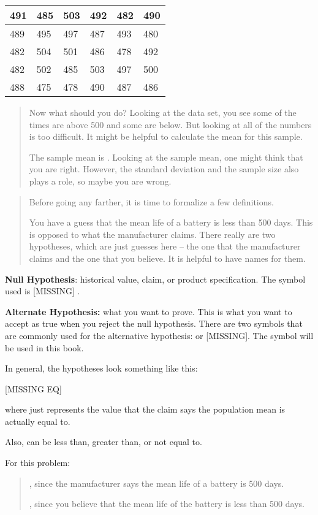\documentclass[]{book}
\begin{document}
\begin{longtable}[]{@{}llllll@{}}
\toprule
491 & 485 & 503 & 492 & 482 & 490\tabularnewline
\midrule
\endhead
489 & 495 & 497 & 487 & 493 & 480\tabularnewline
482 & 504 & 501 & 486 & 478 & 492\tabularnewline
482 & 502 & 485 & 503 & 497 & 500\tabularnewline
488 & 475 & 478 & 490 & 487 & 486\tabularnewline
\bottomrule
\end{longtable}

\begin{quote}
Now what should you do? Looking at the data set, you see some of the times are above 500 and some are below. But looking at all of the numbers is too difficult. It might be helpful to calculate the mean for this sample.

The sample mean is . Looking at the sample mean, one might think that you are right. However, the standard deviation and the sample size also plays a role, so maybe you are wrong.
\end{quote}

\begin{quote}
Before going any farther, it is time to formalize a few definitions.

You have a guess that the mean life of a battery is less than 500 days. This is opposed to what the manufacturer claims. There really are two hypotheses, which are just guesses here -- the one that the manufacturer claims and the one that you believe. It is helpful to have names for them.
\end{quote}

\textbf{Null Hypothesis}: historical value, claim, or product specification. The symbol used is {[}MISSING{]} .

\textbf{Alternate Hypothesis:} what you want to prove. This is what you want to accept as true when you reject the null hypothesis. There are two symbols that are commonly used for the alternative hypothesis: or {[}MISSING{]}. The symbol will be used in this book.

In general, the hypotheses look something like this:

{[}MISSING EQ{]}

where just represents the value that the claim says the population mean is actually equal to.

Also, can be less than, greater than, or not equal to.

For this problem:

\begin{quote}
, since the manufacturer says the mean life of a battery is 500 days.

, since you believe that the mean life of the battery is less than 500 days.
\end{quote}
\end{document}
